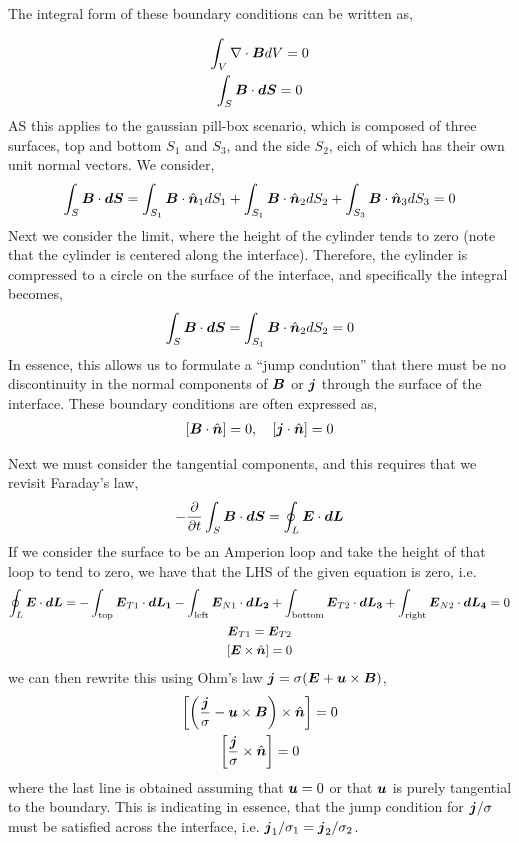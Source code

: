 \documentclass{article}
\begin{document}
The integral form of these boundary conditions can be written as,

\begin{gather*}
    \int_V \nabla \cdot{\boldsymbol{B}} dV = 0\\
    \int_S \boldsymbol{B}\cdot\boldsymbol{dS} = 0
\end{gather*}
AS this applies to the gaussian pill-box scenario, which is composed of three
surfaces, top and bottom $S_1$ and $S_3$, and the side $S_2$, eich of which has
their own unit normal vectors. 
We consider, 
\begin{gather*}
    \int_S \boldsymbol{B}\cdot\boldsymbol{dS} = \int_{S_1}\boldsymbol{B}\cdot\hat{\boldsymbol{n}}_1dS_1 +
    \int_{S_1}\boldsymbol{B}\cdot\hat{\boldsymbol{n}}_2dS_2 + \int_{S_3}\boldsymbol{B}\cdot\hat{\boldsymbol{n}}_3dS_3 =
    0
\end{gather*}
Next we consider the limit, where the height of the cylinder tends to zero (note
that the cylinder is centered along the interface). Therefore, the cylinder is
compressed to a circle on the surface of the interface, and specifically the
integral becomes,
\begin{gather*}
    \int_S \boldsymbol{B}\cdot\boldsymbol{dS} = 
    \int_{S_1}\boldsymbol{B}\cdot\hat{\boldsymbol{n}}_2dS_2  = 0
\end{gather*}
In essence, this allows us to formulate a ``jump condution'' that there must be
no discontinuity in the normal components of $\boldsymbol{B}$ or $\boldsymbol{j}$ through the surface of the interface. These
boundary conditions are often expressed as, 
\begin{gather*}
    \left[\boldsymbol{B}\cdot\hat{\boldsymbol{n}}\right] = 0,
    \quad\left[\boldsymbol{j}\cdot\hat{\boldsymbol{n}}\right] = 0
\end{gather*}

Next we must consider the tangential components, and this requires that we
revisit Faraday's law, 
\begin{gather*}
    -\frac{\partial }{\partial t}\int_S\boldsymbol{B}\cdot\boldsymbol{dS} = \oint_L \boldsymbol{E}\cdot\boldsymbol{dL} 
\end{gather*}
If we consider the surface to be an Amperion loop and take the height of that
loop to tend to zero, we have that the LHS of the given equation is zero, i.e. 
\begin{gather*}
    \oint_L \boldsymbol{E}\cdot\boldsymbol{dL} = -\int_{\text{top}} \boldsymbol{E}_{T1}\cdot\boldsymbol{dL_1} - 
    \int_{\text{left}} \boldsymbol{E}_{N1}\cdot\boldsymbol{dL_2} +\int_{\text{bottom}} \boldsymbol{E}_{T2}\cdot\boldsymbol{dL_3}
    +\int_{\text{right}} \boldsymbol{E}_{N2}\cdot\boldsymbol{dL_4} = 0\\
    \boldsymbol{E}_{T1} = \boldsymbol{E}_{T2}\\
    \left[\boldsymbol{E} \times \hat{\boldsymbol{n}}\right] = 0
\end{gather*}
we can then rewrite this using Ohm's law $\boldsymbol{j} = \sigma(\boldsymbol{E} + \boldsymbol{u}\times\boldsymbol{B})$,
\begin{gather*}
    \left[\left(\frac{\boldsymbol{j}}{\sigma} - \boldsymbol{u}\times\boldsymbol{B}\right) \times \hat{\boldsymbol{n}}\right]
    = 0\\
    \left[\frac{\boldsymbol{j}}{\sigma} \times \hat{\boldsymbol{n}}\right] = 0
\end{gather*}
where the last line is obtained assuming that $\boldsymbol{u} = 0$ or that $\boldsymbol{u}$ is
purely tangential to the boundary. This is indicating in essence, that the jump
condition for $\boldsymbol{j}/\sigma$ must be satisfied across the interface, i.e.
$\boldsymbol{j}_1/\sigma_1 = \boldsymbol{j}_2/\sigma_2$. 
\end{document}
